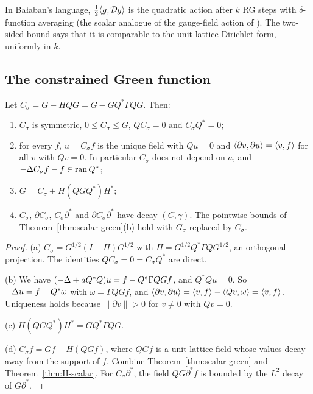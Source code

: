 In Ba\l aban's language, $\frac12\langle g,\mathcal D g\rangle$ is the quadratic action after $k$ RG steps with $\delta$-function averaging (the scalar analogue of the gauge-field action of \cite[(1.65)--(1.67)]{BalPropI}). The two-sided bound says that it is comparable to the unit-lattice Dirichlet form, uniformly in $k$.

\subsection{The constrained Green function}\label{ss:8.4}

\begin{proposition}\label{prop:C-scalar}
Let $C_\sigma=G-HQG=G-GQ^*\Gamma QG$. Then:
\begin{enumerate}[label=(\alph*)]
\item $C_\sigma$ is symmetric, $0\le C_\sigma\le G$, $QC_\sigma=0$ and $C_\sigma Q^*=0$;
\item for every $f$, $u=C_\sigma f$ is the unique field with $Qu=0$ and $\langle \partial v,\partial u\rangle=\langle v,f\rangle$ for all $v$ with $Qv=0$. In particular $C_\sigma$ does not depend on $a$, and $-\Delta C_\sigma f-f\in\operatorname{ran} Q^*$;
\item $G=C_\sigma+H(QGQ^*)H^*$;
\item $C_\sigma$, $\partial C_\sigma$, $C_\sigma\partial^*$ and $\partial C_\sigma\partial^*$ have decay $(C,\gamma)$. The pointwise bounds of Theorem~\ref{thm:scalar-green}(b) hold with $G_\sigma$ replaced by $C_\sigma$.
\end{enumerate}
\end{proposition}

\begin{proof}
(a) $C_\sigma=G^{1/2}(I-\Pi)G^{1/2}$ with $\Pi=G^{1/2}Q^*\Gamma QG^{1/2}$, an orthogonal projection. The identities $QC_\sigma=0=C_\sigma Q^*$ are direct.

(b) We have $(-\Delta+aQ^*Q)u=f-Q^*\Gamma QGf$, and $Q^*Qu=0$. So $-\Delta u=f-Q^*\omega$ with $\omega=\Gamma QGf$, and $\langle \partial v,\partial u\rangle=\langle v,f\rangle-\langle Qv,\omega\rangle=\langle v,f\rangle$. Uniqueness holds because $\|\partial v\|>0$ for $v\ne0$ with $Qv=0$.

(c) $H(QGQ^*)H^*=GQ^*\Gamma QG$.

(d) $C_\sigma f=Gf-H(QGf)$, where $QGf$ is a unit-lattice field whose values decay away from the support of $f$. Combine Theorem~\ref{thm:scalar-green} and Theorem~\ref{thm:H-scalar}. For $C_\sigma\partial^*$, the field $QG\partial^*f$ is bounded by the $L^2$ decay of $G\partial^*$.
\end{proof}

